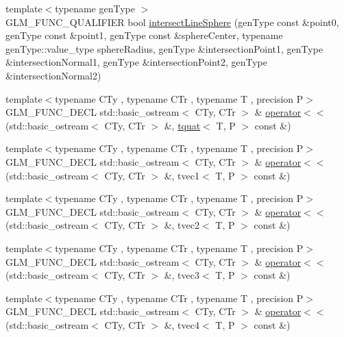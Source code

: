 \begin{DoxyCompactItemize}
\item 
{\footnotesize template$<$typename gen\+Type $>$ }\\G\+L\+M\+\_\+\+F\+U\+N\+C\+\_\+\+Q\+U\+A\+L\+I\+F\+I\+E\+R bool \hyperlink{group__gtx__intersect_ga9c68139f3d8a4f3d7fe45f9dbc0de5b7}{intersect\+Line\+Sphere} (gen\+Type const \&point0, gen\+Type const \&point1, gen\+Type const \&sphere\+Center, typename gen\+Type\+::value\+\_\+type sphere\+Radius, gen\+Type \&intersection\+Point1, gen\+Type \&intersection\+Normal1, gen\+Type \&intersection\+Point2, gen\+Type \&intersection\+Normal2)
\item 
{\footnotesize template$<$typename C\+Ty , typename C\+Tr , typename T , precision P$>$ }\\G\+L\+M\+\_\+\+F\+U\+N\+C\+\_\+\+D\+E\+C\+L std\+::basic\+\_\+ostream$<$ C\+Ty, C\+Tr $>$ \& \hyperlink{group__gtx__io_ga038d37e8d7965dc7bfae5dc23e4140af}{operator$<$$<$} (std\+::basic\+\_\+ostream$<$ C\+Ty, C\+Tr $>$ \&, \hyperlink{structglm_1_1tquat}{tquat}$<$ T, P $>$ const \&)
\item 
{\footnotesize template$<$typename C\+Ty , typename C\+Tr , typename T , precision P$>$ }\\G\+L\+M\+\_\+\+F\+U\+N\+C\+\_\+\+D\+E\+C\+L std\+::basic\+\_\+ostream$<$ C\+Ty, C\+Tr $>$ \& \hyperlink{group__gtx__io_ga171289d1671b75e033a1b078c68a7460}{operator$<$$<$} (std\+::basic\+\_\+ostream$<$ C\+Ty, C\+Tr $>$ \&, tvec1$<$ T, P $>$ const \&)
\item 
{\footnotesize template$<$typename C\+Ty , typename C\+Tr , typename T , precision P$>$ }\\G\+L\+M\+\_\+\+F\+U\+N\+C\+\_\+\+D\+E\+C\+L std\+::basic\+\_\+ostream$<$ C\+Ty, C\+Tr $>$ \& \hyperlink{group__gtx__io_ga0a3bca262adbba991f394d8d3d52e10d}{operator$<$$<$} (std\+::basic\+\_\+ostream$<$ C\+Ty, C\+Tr $>$ \&, tvec2$<$ T, P $>$ const \&)
\item 
{\footnotesize template$<$typename C\+Ty , typename C\+Tr , typename T , precision P$>$ }\\G\+L\+M\+\_\+\+F\+U\+N\+C\+\_\+\+D\+E\+C\+L std\+::basic\+\_\+ostream$<$ C\+Ty, C\+Tr $>$ \& \hyperlink{group__gtx__io_ga0d6cfb5d138639b90f18d7bbb2a4ae56}{operator$<$$<$} (std\+::basic\+\_\+ostream$<$ C\+Ty, C\+Tr $>$ \&, tvec3$<$ T, P $>$ const \&)
\item 
{\footnotesize template$<$typename C\+Ty , typename C\+Tr , typename T , precision P$>$ }\\G\+L\+M\+\_\+\+F\+U\+N\+C\+\_\+\+D\+E\+C\+L std\+::basic\+\_\+ostream$<$ C\+Ty, C\+Tr $>$ \& \hyperlink{group__gtx__io_ga948ab426a879f24236d8978ee9b5fade}{operator$<$$<$} (std\+::basic\+\_\+ostream$<$ C\+Ty, C\+Tr $>$ \&, tvec4$<$ T, P $>$ const \&)

\end{DoxyCompactItemize}
